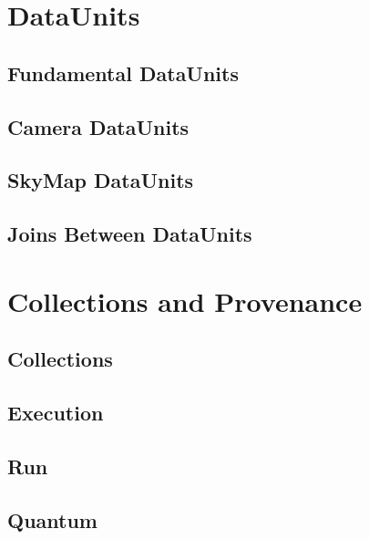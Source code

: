 \documentclass[DM,toc]{lsstdoc}
\newcommand{\coltable}[1]{
    \begin{table}
        {\footnotesize
        }
        \caption{#1 Columns}
        \label{tbl:#1}
    \end{table}
}
\begin{document}
\coltable{DatasetComposition}

\section{DataUnits}
\label{sec:dataunits}

\subsection{Fundamental DataUnits}
\label{sec:fundamental-dataunits}

\subsection{Camera DataUnits}
\label{sec:camera-dataunits}

\subsection{SkyMap DataUnits}
\label{sec:skymap-dataunits}

\subsection{Joins Between DataUnits}
\label{sec:joins-between-dataunits}


\section{Collections and Provenance}
\label{sec:collections-and-provenance}

\subsection{Collections}
\label{sec:collections}

\coltable{DatasetCollection}

\subsection{Execution}
\label{sec:excution}

\coltable{Execution}

\subsection{Run}
\label{sec:run}

\coltable{Run}

\subsection{Quantum}
\label{sec:quantum}
\end{document}
